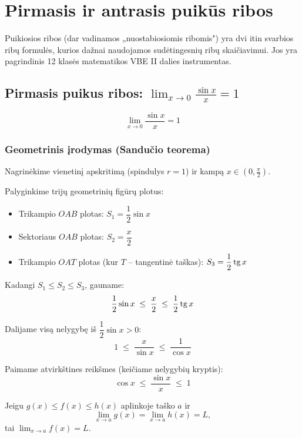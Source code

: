 \section{Pirmasis ir antrasis puikūs ribos}

Puikiosios ribos (dar vadinamos „nuostabiosiomis ribomis") yra dvi itin svarbios ribų formulės, kurios dažnai naudojamos sudėtingesnių ribų skaičiavimui. Jos yra pagrindinis 12 klasės matematikos VBE II dalies instrumentas.

\subsection{Pirmasis puikus ribos: \texorpdfstring{$\lim_{x \to 0} \frac{\sin x}{x} = 1$}{lim(sin(x)/x) = 1, kai x->0}}

\begin{tcolorbox}[colback=blue!5!white, colframe=blue!60!black, title=Pirmoji puikioji riba]
\[
  \lim_{x \to 0} \frac{\sin x}{x} = 1
\]
\end{tcolorbox}

\subsubsection*{Geometrinis įrodymas (Sandučio teorema)}

Nagrinėkime vienetinį apskritimą (spindulys $r = 1$) ir kampą $x \in \left(0, \frac{\pi}{2}\right)$.

Palyginkime trijų geometrinių figūrų plotus:
\begin{itemize}
  \item Trikampio $OAB$ plotas: $S_1 = \dfrac{1}{2}\sin x$
  \item Sektoriaus $OAB$ plotas: $S_2 = \dfrac{x}{2}$
  \item Trikampio $OAT$ plotas (kur $T$ – tangentinė taškas): $S_3 = \dfrac{1}{2}\operatorname{tg} x$
\end{itemize}

Kadangi $S_1 \leq S_2 \leq S_3$, gauname:
\[
  \frac{1}{2}\sin x \;\leq\; \frac{x}{2} \;\leq\; \frac{1}{2}\operatorname{tg} x
\]

Dalijame visą nelygybę iš $\dfrac{1}{2}\sin x > 0$:
\[
  1 \;\leq\; \frac{x}{\sin x} \;\leq\; \frac{1}{\cos x}
\]

Paimame atvirkštines reikšmes (keičiame nelygybių kryptis):
\[
  \cos x \;\leq\; \frac{\sin x}{x} \;\leq\; 1
\]

\begin{theorem}
Jeigu $g(x) \leq f(x) \leq h(x)$ aplinkoje taško $a$ ir
\[
  \lim_{x \to a} g(x) = \lim_{x \to a} h(x) = L,
\]
tai $\lim_{x \to a} f(x) = L$.
\end{theorem}

